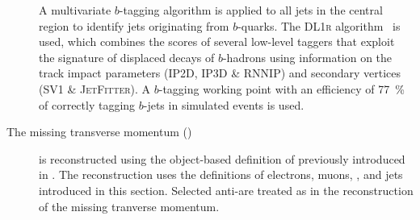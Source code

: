 \begin{description}
  A multivariate $b$-tagging algorithm is applied to all jets in the central
  region to identify jets originating from $b$-quarks.
  The \textsc{DL1r} algorithm~\cite{FTAG-2019-07} is used, which combines the
  scores of several low-level taggers that exploit the signature of displaced
  decays of $b$-hadrons using information on the track impact parameters
  (\textsc{IP2D}, \textsc{IP3D} \& \textsc{RNNIP}) and secondary vertices
  (\textsc{SV1} \& \textsc{JetFitter}). A $b$-tagging working point with an
  efficiency of \SI{77}{\percent} of correctly tagging $b$-jets in simulated
  \ttbar events is used.

\item[The missing transverse momentum (\pTmiss)] is reconstructed using the
  object-based definition of \pTmiss previously introduced in
  . The \pTmiss reconstruction uses the definitions of
  electrons, muons, \tauhadvis, and jets introduced in this section. Selected
  anti-\tauhadvis are treated as \tauhadvis in the reconstruction of the missing
  tranverse momentum.



\end{description}



